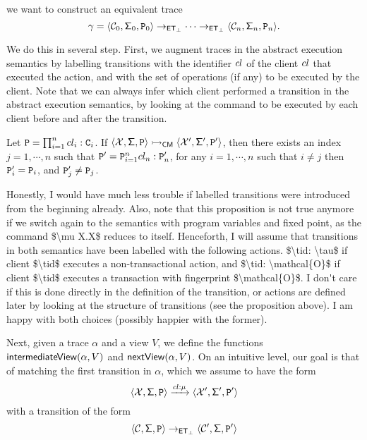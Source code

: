 we want to construct an equivalent trace 
\[
\gamma = \langle \mathcal{C}_0, \mathsf{\Sigma}_0, \texttt{P}_0 \rangle \rightarrow_{\mathsf{ET}_{\bot}} \cdots \rightarrow_{\mathsf{ET}_{\bot}} \langle 
\mathcal{C}_{n}, \mathsf{\Sigma}_n, \texttt{P}_n \rangle.
\]

We do this in several step. 
First, we augment traces in the abstract execution semantics by labelling transitions 
with the identifier $\tid$ of the client $\tid$ that executed the action, 
and with the set of operations (if any) to be executed by the client. 
Note that we can always infer which client performed a transition 
in the abstract execution semantics, by looking at the command 
to be executed by each client before and after the transition.
\begin{proposition}
Let $\texttt{P} = \prod_{i = 1}^{n} cl_{i}: \texttt{C}_{i}$. 
If $\langle \mathcal{X}, \mathsf{\Sigma}, \texttt{P} \rangle \rightarrowtail_{\mathsf{CM}} 
\langle \mathcal{X}', \mathsf{\Sigma}', \texttt{P}' \rangle$, then there exists 
an index $j=1,\cdots, n$ such that $\texttt{P}' = 
\texttt{P}_{i=1}^{n} cl_{n}: \texttt{P}'_{n}$, for any $i =1,\cdots, n$ 
such that $i \neq j$ then $\texttt{P}'_{i} = \texttt{P}_{i}$, and $\texttt{P}'_{j} \neq \texttt{P}_{j}$.
\end{proposition}
\ac{Honestly, I would have much less trouble if labelled 
transitions were introduced from the beginning 
already. Also, note that this proposition is not true anymore if we switch 
again to the semantics with program variables and fixed point, as the command 
$\mu X.X$ reduces to itself.}
\ac{Henceforth, I will assume that transitions in both semantics have been labelled 
with the following actions. $\tid: \tau$ if client $\tid$ executes a non-transactional 
action, and $\tid: \mathcal{O}$ if client $\tid$ executes a transaction with fingerprint 
$\mathcal{O}$. I don't care if this is done directly in the definition of the transition, 
or actions are defined later by looking at the structure of transitions (see the proposition 
above). I am happy with both choices (possibly happier with the former).}

Next, given a trace $\alpha$ and a view $V$, 
we define the functions $\mathsf{intermediateView}(\alpha, V)$ and $\mathsf{nextView}(\alpha, V)$. 
On an intuitive level, our goal is that of matching the  
first transition in $\alpha$, which we assume to have the form 
\[
\langle \mathcal{X}, \mathsf{\Sigma}, \texttt{P} \rangle \xrightarrow{cl: \mu} \langle \mathcal{X}', \mathsf{\Sigma}', \texttt{P}' \rangle
\]
 with a transition of the form 
\[
\langle \mathcal{C}, \mathsf{\Sigma}, \texttt{P} \rangle \rightarrow_{\mathsf{ET}_{\bot}} \langle \mathcal{C}', \mathsf{\Sigma}, \texttt{P}' \rangle
\]
 
